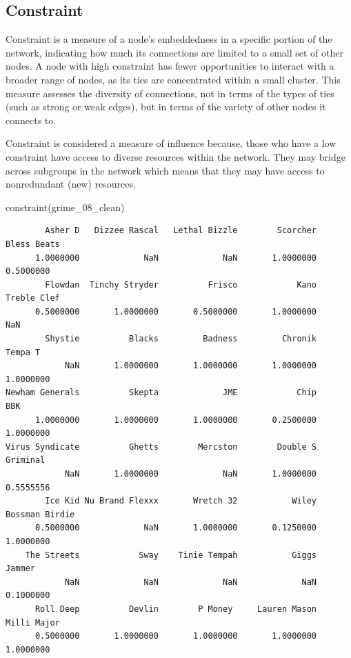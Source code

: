 \documentclass[
  letterpaper,
  DIV=11,
  numbers=noendperiod]{scrreprt}
\newenvironment{Shaded}{\begin{snugshade}}{\end{snugshade}}
\newcommand{\FunctionTok}[1]{\textcolor[rgb]{0.28,0.35,0.67}{#1}}
\newcommand{\NormalTok}[1]{\textcolor[rgb]{0.00,0.23,0.31}{#1}}
\begin{document}
\subsection{Constraint}\label{constraint}

Constraint is a measure of a node's embeddedness in a specific portion
of the network, indicating how much its connections are limited to a
small set of other nodes. A node with high constraint has fewer
opportunities to interact with a broader range of nodes, as its ties are
concentrated within a small cluster. This measure assesses the diversity
of connections, not in terms of the types of ties (such as strong or
weak edges), but in terms of the variety of other nodes it connects to.

Constraint is considered a measure of influence because, those who have
a low constraint have access to diverse resources within the network.
They may bridge across subgroups in the network which means that they
may have access to nonredundant (new) resources.

\begin{Shaded}
\begin{Highlighting}[]
\FunctionTok{constraint}\NormalTok{(grime\_08\_clean)}
\end{Highlighting}
\end{Shaded}

\begin{verbatim}
        Asher D   Dizzee Rascal   Lethal Bizzle        Scorcher     Bless Beats 
      1.0000000             NaN             NaN       1.0000000       0.5000000 
        Flowdan  Tinchy Stryder          Frisco            Kano     Treble Clef 
      0.5000000       1.0000000       0.5000000       1.0000000             NaN 
        Shystie          Blacks         Badness         Chronik         Tempa T 
            NaN       1.0000000       1.0000000       1.0000000       1.0000000 
Newham Generals          Skepta             JME            Chip             BBK 
      1.0000000       1.0000000       1.0000000       0.2500000       1.0000000 
Virus Syndicate          Ghetts        Mercston        Double S        Griminal 
            NaN       1.0000000             NaN       1.0000000       0.5555556 
        Ice Kid Nu Brand Flexxx       Wretch 32           Wiley  Bossman Birdie 
      0.5000000             NaN       1.0000000       0.1250000       1.0000000 
    The Streets            Sway    Tinie Tempah           Giggs          Jammer 
            NaN             NaN             NaN             NaN       0.1000000 
      Roll Deep          Devlin        P Money     Lauren Mason     Milli Major 
      0.5000000       1.0000000       1.0000000       1.0000000       1.0000000 
\end{verbatim}
\end{document}
